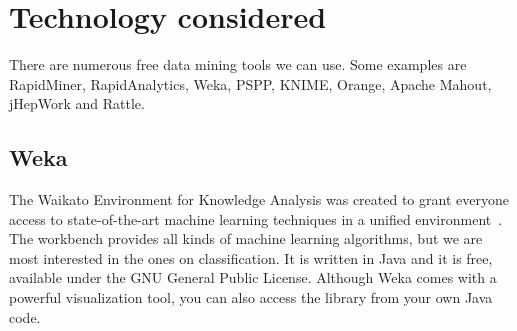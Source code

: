 \section{Technology considered}
There are numerous free data mining tools we can use. Some examples are RapidMiner, RapidAnalytics, Weka, PSPP, KNIME, Orange, Apache Mahout, jHepWork and Rattle.
\subsection{Weka}
The Waikato Environment for Knowledge Analysis was created to grant everyone access to state-of-the-art machine learning techniques in a unified environment~\cite{Hall:2009:WDM:1656274.1656278}. 
The workbench provides all kinds of machine learning algorithms, but we are most interested in the ones on classification. 
It is written in Java and it is free, available under the GNU General Public License. 
Although Weka comes with a powerful visualization tool, you can also access the library from your own Java code.


